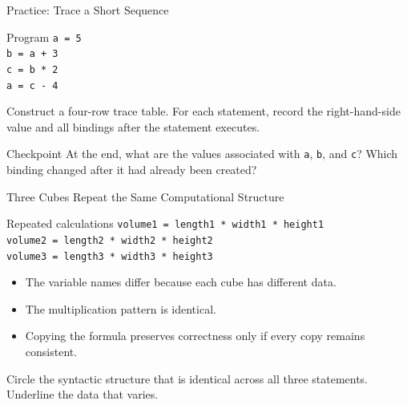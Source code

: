 \documentclass[aspectratio=169,10pt]{beamer}
\begin{document}
\begin{frame}{Practice: Trace a Short Sequence}
  \begin{block}{Program}
    \texttt{a = 5}\\
    \texttt{b = a + 3}\\
    \texttt{c = b * 2}\\
    \texttt{a = c - 4}
  \end{block}

  \begin{activity}
    Construct a four-row trace table. For each statement, record the right-hand-side value and all bindings after the statement executes.
  \end{activity}

  \begin{block}{Checkpoint}
    At the end, what are the values associated with \texttt{a}, \texttt{b}, and \texttt{c}? Which binding changed after it had already been created?
  \end{block}
\end{frame}


\begin{frame}{Three Cubes Repeat the Same Computational Structure}
  \begin{block}{Repeated calculations}
    \texttt{volume1 = length1 * width1 * height1}\\[0.08in]
    \texttt{volume2 = length2 * width2 * height2}\\[0.08in]
    \texttt{volume3 = length3 * width3 * height3}
  \end{block}

  \begin{itemize}
    \item The variable names differ because each cube has different data.
    \item The multiplication pattern is identical.
    \item Copying the formula preserves correctness only if every copy remains consistent.
  \end{itemize}

  \begin{activity}
    Circle the syntactic structure that is identical across all three statements. Underline the data that varies.
  \end{activity}
\end{frame}
\end{document}

